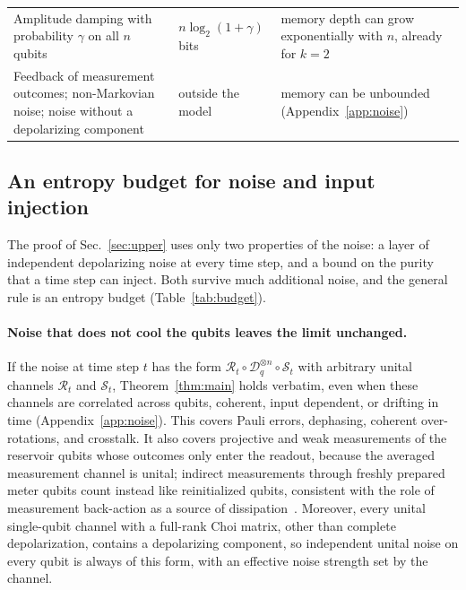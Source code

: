 \documentclass[aps,pra,reprint,superscriptaddress,floatfix]{revtex4-2}
\theoremstyle{plain}
\newcommand{\cD}{\mathcal D}
\begin{document}
\begin{table}[t]
\begin{ruledtabular}
\begin{tabular}{p{5.5cm}p{2.8cm}p{7.9cm}}
{\raggedright Amplitude damping with probability $\gamma$ on all $n$ qubits\par} & {\raggedright $n\log_2(1+\gamma)$ bits\par} & {\raggedright memory depth can grow exponentially with $n$, already for $k=2$~\cite{BenOr2013,Monzani2024,Freiheit2026}\par} \\
{\raggedright Feedback of measurement outcomes; non-Markovian noise; noise without a depolarizing component\par} & {\raggedright outside the model\par} & {\raggedright memory can be unbounded (Appendix~\ref{app:noise})~\cite{Sannia2026}\par} \\
\end{tabular}
\end{ruledtabular}
\end{table}

\subsection{An entropy budget for noise and input injection}

The proof of Sec.~\ref{sec:upper} uses only two properties of the noise: a layer of independent depolarizing noise at every time step, and a bound on the purity that a time step can inject. Both survive much additional noise, and the general rule is an entropy budget (Table~\ref{tab:budget}).

\paragraph*{Noise that does not cool the qubits leaves the limit unchanged.}
If the noise at time step $t$ has the form $\mathcal R_t\circ\cD_q^{\otimes n}\circ\mathcal S_t$ with arbitrary unital channels $\mathcal R_t$ and $\mathcal S_t$, Theorem~\ref{thm:main} holds verbatim, even when these channels are correlated across qubits, coherent, input dependent, or drifting in time (Appendix~\ref{app:noise}). This covers Pauli errors, dephasing, coherent over-rotations, and crosstalk. It also covers projective and weak measurements of the reservoir qubits whose outcomes only enter the readout, because the averaged measurement channel is unital; indirect measurements through freshly prepared meter qubits count instead like reinitialized qubits, consistent with the role of measurement back-action as a source of dissipation~\cite{MorguiSancho2026}. Moreover, every unital single-qubit channel with a full-rank Choi matrix, other than complete depolarization, contains a depolarizing component, so independent unital noise on every qubit is always of this form, with an effective noise strength set by the channel.
\end{document}
